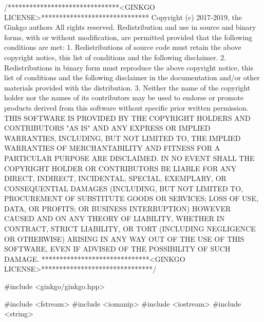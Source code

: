 \begin{DoxyCodeInclude}
\textcolor{comment}{/*******************************<GINKGO LICENSE>******************************}
\textcolor{comment}{Copyright (c) 2017-2019, the Ginkgo authors}
\textcolor{comment}{All rights reserved.}
\textcolor{comment}{}
\textcolor{comment}{Redistribution and use in source and binary forms, with or without}
\textcolor{comment}{modification, are permitted provided that the following conditions}
\textcolor{comment}{are met:}
\textcolor{comment}{}
\textcolor{comment}{1. Redistributions of source code must retain the above copyright}
\textcolor{comment}{notice, this list of conditions and the following disclaimer.}
\textcolor{comment}{}
\textcolor{comment}{2. Redistributions in binary form must reproduce the above copyright}
\textcolor{comment}{notice, this list of conditions and the following disclaimer in the}
\textcolor{comment}{documentation and/or other materials provided with the distribution.}
\textcolor{comment}{}
\textcolor{comment}{3. Neither the name of the copyright holder nor the names of its}
\textcolor{comment}{contributors may be used to endorse or promote products derived from}
\textcolor{comment}{this software without specific prior written permission.}
\textcolor{comment}{}
\textcolor{comment}{THIS SOFTWARE IS PROVIDED BY THE COPYRIGHT HOLDERS AND CONTRIBUTORS "AS}
\textcolor{comment}{IS" AND ANY EXPRESS OR IMPLIED WARRANTIES, INCLUDING, BUT NOT LIMITED}
\textcolor{comment}{TO, THE IMPLIED WARRANTIES OF MERCHANTABILITY AND FITNESS FOR A}
\textcolor{comment}{PARTICULAR PURPOSE ARE DISCLAIMED. IN NO EVENT SHALL THE COPYRIGHT}
\textcolor{comment}{HOLDER OR CONTRIBUTORS BE LIABLE FOR ANY DIRECT, INDIRECT, INCIDENTAL,}
\textcolor{comment}{SPECIAL, EXEMPLARY, OR CONSEQUENTIAL DAMAGES (INCLUDING, BUT NOT}
\textcolor{comment}{LIMITED TO, PROCUREMENT OF SUBSTITUTE GOODS OR SERVICES; LOSS OF USE,}
\textcolor{comment}{DATA, OR PROFITS; OR BUSINESS INTERRUPTION) HOWEVER CAUSED AND ON ANY}
\textcolor{comment}{THEORY OF LIABILITY, WHETHER IN CONTRACT, STRICT LIABILITY, OR TORT}
\textcolor{comment}{(INCLUDING NEGLIGENCE OR OTHERWISE) ARISING IN ANY WAY OUT OF THE USE}
\textcolor{comment}{OF THIS SOFTWARE, EVEN IF ADVISED OF THE POSSIBILITY OF SUCH DAMAGE.}
\textcolor{comment}{******************************<GINKGO LICENSE>*******************************/}

\textcolor{preprocessor}{#include <ginkgo/ginkgo.hpp>}


\textcolor{preprocessor}{#include <fstream>}
\textcolor{preprocessor}{#include <iomanip>}
\textcolor{preprocessor}{#include <iostream>}
\textcolor{preprocessor}{#include <string>}



\end{DoxyCodeInclude}
